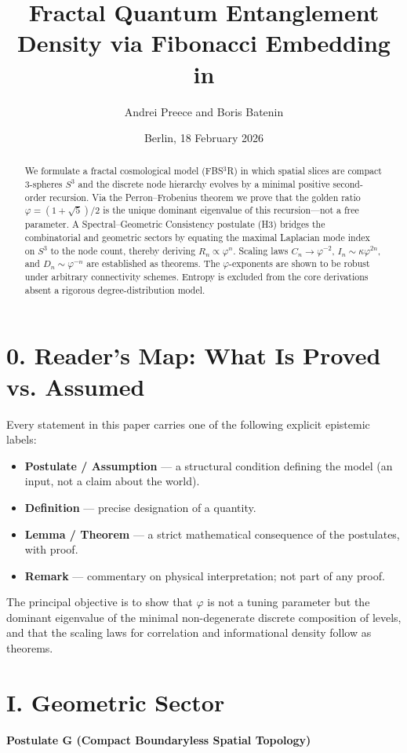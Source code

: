 \documentclass[12pt]{article}
\title{\textbf{Fractal Quantum Entanglement Density via Fibonacci Embedding in \FBSR}}
\author{Andrei Preece and Boris Batenin}
\date{Berlin, 18 February 2026}
\newcommand{\FBSR}{FBS$^3$R}
\newcommand{\ph}{\varphi}
\begin{document}
\maketitle

\begin{abstract}
We formulate a fractal cosmological model (\FBSR) in which spatial slices are compact 3-spheres $S^3$ and the discrete node hierarchy evolves by a minimal positive second-order recursion. Via the Perron--Frobenius theorem we prove that the golden ratio $\ph=(1+\sqrt{5})/2$ is the unique dominant eigenvalue of this recursion---not a free parameter. A Spectral--Geometric Consistency postulate (H3) bridges the combinatorial and geometric sectors by equating the maximal Laplacian mode index on $S^3$ to the node count, thereby deriving $R_n \propto \ph^n$. Scaling laws $C_n \to \ph^{-2}$, $I_n \sim \kappa\ph^{2n}$, and $D_n \sim \ph^{-n}$ are established as theorems. The $\ph$-exponents are shown to be robust under arbitrary connectivity schemes. Entropy is excluded from the core derivations absent a rigorous degree-distribution model.
\end{abstract}

\section*{0. Reader's Map: What Is Proved vs. Assumed}
Every statement in this paper carries one of the following explicit epistemic labels:
\begin{itemize}[leftmargin=2em]
    \item \textbf{Postulate / Assumption} --- a structural condition defining the model (an input, not a claim about the world).
    \item \textbf{Definition} --- precise designation of a quantity.
    \item \textbf{Lemma / Theorem} --- a strict mathematical consequence of the postulates, with proof.
    \item \textbf{Remark} --- commentary on physical interpretation; not part of any proof.
\end{itemize}

The principal objective is to show that $\ph$ is not a tuning parameter but the dominant eigenvalue of the minimal non-degenerate discrete composition of levels, and that the scaling laws for correlation and informational density follow as theorems.

\section*{I. Geometric Sector}
\textbf{Postulate G (Compact Boundaryless Spatial Topology)}
\end{document}
